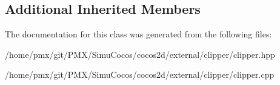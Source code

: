 \subsection*{Additional Inherited Members}


The documentation for this class was generated from the following files\+:\begin{DoxyCompactItemize}
\item 
/home/pmx/git/\+P\+M\+X/\+Simu\+Cocos/cocos2d/external/clipper/clipper.\+hpp\item 
/home/pmx/git/\+P\+M\+X/\+Simu\+Cocos/cocos2d/external/clipper/clipper.\+cpp\end{DoxyCompactItemize}
